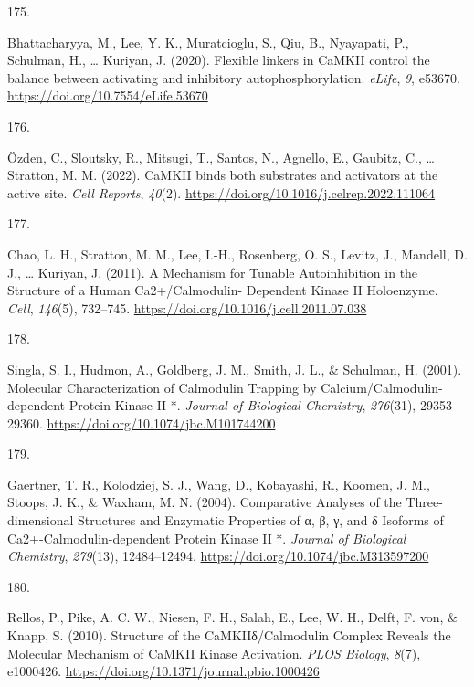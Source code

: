 \documentclass[
  11pt,
  letterpaper,
]{scrreprt}
\newlength{\cslhangindent}
\newlength{\csllabelwidth}
\newenvironment{CSLReferences}[2] %
 {\begin{list}{}{%
  \setlength{\itemindent}{0pt}
  \setlength{\leftmargin}{0pt}
  \setlength{\parsep}{0pt}
  \ifodd #1
   \setlength{\leftmargin}{\cslhangindent}
   \setlength{\itemindent}{-1\cslhangindent}
  \fi
  \setlength{\itemsep}{#2\baselineskip}}}
 {\end{list}}
\newcommand{\CSLLeftMargin}[1]{\parbox[t]{\csllabelwidth}{\strut#1\strut}}
\newcommand{\CSLRightInline}[1]{\parbox[t]{\linewidth - \csllabelwidth}{\strut#1\strut}}
\begin{document}
\begin{CSLReferences}{0}{0}
\CSLLeftMargin{175. }%
\CSLRightInline{Bhattacharyya, M., Lee, Y. K., Muratcioglu, S., Qiu, B.,
Nyayapati, P., Schulman, H., \ldots{} Kuriyan, J. (2020). Flexible
linkers in {CaMKII} control the balance between activating and
inhibitory autophosphorylation. \emph{eLife}, \emph{9}, e53670.
\url{https://doi.org/10.7554/eLife.53670}}

\CSLLeftMargin{176. }%
\CSLRightInline{Özden, C., Sloutsky, R., Mitsugi, T., Santos, N.,
Agnello, E., Gaubitz, C., \ldots{} Stratton, M. M. (2022). {CaMKII}
binds both substrates and activators at the active site. \emph{Cell
Reports}, \emph{40}(2).
\url{https://doi.org/10.1016/j.celrep.2022.111064}}

\CSLLeftMargin{177. }%
\CSLRightInline{Chao, L. H., Stratton, M. M., Lee, I.-H., Rosenberg, O.
S., Levitz, J., Mandell, D. J., \ldots{} Kuriyan, J. (2011). A
{Mechanism} for {Tunable Autoinhibition} in the {Structure} of a {Human
Ca2}+/{Calmodulin- Dependent Kinase II Holoenzyme}. \emph{Cell},
\emph{146}(5), 732--745.
\url{https://doi.org/10.1016/j.cell.2011.07.038}}

\CSLLeftMargin{178. }%
\CSLRightInline{Singla, S. I., Hudmon, A., Goldberg, J. M., Smith, J.
L., \& Schulman, H. (2001). Molecular {Characterization} of {Calmodulin
Trapping} by {Calcium}/{Calmodulin-dependent Protein Kinase II} *.
\emph{Journal of Biological Chemistry}, \emph{276}(31), 29353--29360.
\url{https://doi.org/10.1074/jbc.M101744200}}

\CSLLeftMargin{179. }%
\CSLRightInline{Gaertner, T. R., Kolodziej, S. J., Wang, D., Kobayashi,
R., Koomen, J. M., Stoops, J. K., \& Waxham, M. N. (2004). Comparative
{Analyses} of the {Three-dimensional Structures} and {Enzymatic
Properties} of α, β, γ, and δ {Isoforms} of {Ca2}+-{Calmodulin-dependent
Protein Kinase II} *. \emph{Journal of Biological Chemistry},
\emph{279}(13), 12484--12494.
\url{https://doi.org/10.1074/jbc.M313597200}}

\CSLLeftMargin{180. }%
\CSLRightInline{Rellos, P., Pike, A. C. W., Niesen, F. H., Salah, E.,
Lee, W. H., Delft, F. von, \& Knapp, S. (2010). Structure of the
{CaMKIIδ}/{Calmodulin Complex Reveals} the {Molecular Mechanism} of
{CaMKII Kinase Activation}. \emph{PLOS Biology}, \emph{8}(7), e1000426.
\url{https://doi.org/10.1371/journal.pbio.1000426}}


\end{CSLReferences}
\end{document}
